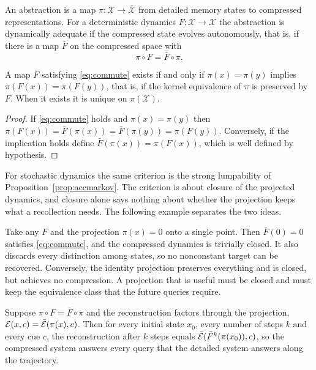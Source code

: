 An abstraction is a map $\pi:\mathcal X\to\bar{\mathcal X}$ from detailed memory states to compressed representations. For a deterministic dynamics $F:\mathcal X\to\mathcal X$ the abstraction is dynamically adequate if the compressed state evolves autonomously, that is, if there is a map $\bar F$ on the compressed space with
\begin{equation}\label{eq:commute}
\pi\circ F=\bar F\circ\pi.
\end{equation}

\begin{proposition}\label{prop:closure}
A map $\bar F$ satisfying \eqref{eq:commute} exists if and only if $\pi(x)=\pi(y)$ implies $\pi(F(x))=\pi(F(y))$, that is, if the kernel equivalence of $\pi$ is preserved by $F$. When it exists it is unique on $\pi(\mathcal X)$.
\end{proposition}

\begin{proof}
If \eqref{eq:commute} holds and $\pi(x)=\pi(y)$ then $\pi(F(x))=\bar F(\pi(x))=\bar F(\pi(y))=\pi(F(y))$. Conversely, if the implication holds define $\bar F(\pi(x))=\pi(F(x))$, which is well defined by hypothesis.
\end{proof}

For stochastic dynamics the same criterion is the strong lumpability of Proposition~\ref{prop:accmarkov}. The criterion is about closure of the projected dynamics, and closure alone says nothing about whether the projection keeps what a recollection needs. The following example separates the two ideas.

\begin{example}\label{ex:trivialproj}
Take any $F$ and the projection $\pi(x)=0$ onto a single point. Then $\bar F(0)=0$ satisfies \eqref{eq:commute}, and the compressed dynamics is trivially closed. It also discards every distinction among states, so no nonconstant target can be recovered. Conversely, the identity projection preserves everything and is closed, but achieves no compression. A projection that is useful must be closed and must keep the equivalence class that the future queries require.
\end{example}

\begin{proposition}\label{prop:closeandsuff}
Suppose $\pi\circ F=\bar F\circ\pi$ and the reconstruction factors through the projection, $\mathcal{E}(x,c)=\bar{\mathcal{E}}(\pi(x),c)$. Then for every initial state $x_0$, every number of steps $k$ and every cue $c$, the reconstruction after $k$ steps equals $\bar{\mathcal{E}}(\bar F^k(\pi(x_0)),c)$, so the compressed system answers every query that the detailed system answers along the trajectory.
\end{proposition}


